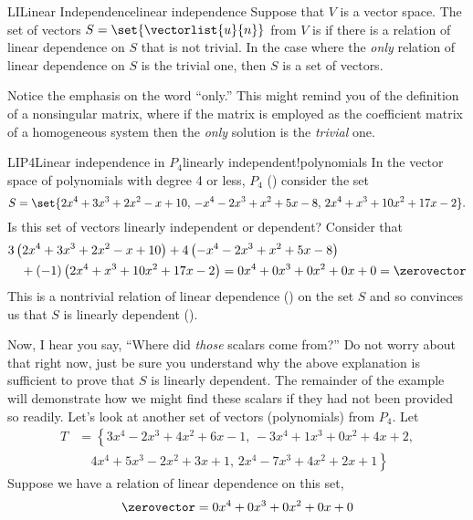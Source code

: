 %
\begin{definition}{LI}{Linear Independence}{linear independence}
Suppose that $V$ is a vector space.
The set of vectors $S=\set{\vectorlist{u}{n}}$ from $V$ is  if there is a relation of linear dependence on $S$ that is not trivial.  In the case where the {\em only} relation of linear dependence on $S$ is the trivial one, then $S$ is a  set of vectors.
\end{definition}
%
Notice the emphasis on the word ``only.''  This might remind you of the definition of a nonsingular matrix, where if the matrix is employed as the coefficient matrix of a homogeneous system then the {\em only} solution is the {\em trivial} one.
%
%
\begin{example}{LIP4}{Linear independence in $P_4$}{linearly independent!polynomials}
In the vector space of polynomials with degree 4 or less, $P_4$ () consider the set
%
\begin{equation*}
S=\set{
2x^4+3x^3+2x^2-x+10,\,
-x^4-2x^3+x^2+5x-8,\,
2x^4+x^3+10x^2+17x-2
}.
\end{equation*}
%
Is this set of vectors linearly independent or dependent?  Consider that 
%
\begin{align*}
&3\left(2x^4+3x^3+2x^2-x+10\right)
+4\left(-x^4-2x^3+x^2+5x-8\right)\\
&\quad +(-1)\left(2x^4+x^3+10x^2+17x-2\right)
=0x^4+0x^3+0x^2+0x+0=\zerovector
\end{align*}
%
This is a nontrivial relation of linear dependence () on the set $S$ and so convinces us that $S$ is linearly dependent ().\par
%
Now, I hear you say, ``Where did {\em those} scalars come from?''  Do not worry about that right now, just be sure you understand why the above explanation is sufficient to prove that $S$ is linearly dependent.  The remainder of the example will demonstrate how we might find these scalars if they had not been provided so readily.
%
Let's look at another set of vectors (polynomials) from $P_4$.  Let
%
\begin{align*}
T&=\left\{
3x^4-2x^3+4x^2+6x-1,\,
-3x^4+1x^3+0x^2+4x+2,\right.\\
&\quad \left.4x^4+5x^3-2x^2+3x+1,\,
2x^4-7x^3+4x^2+2x+1\right\}
\end{align*}
%
Suppose we have a relation of linear dependence on this set,
%
\begin{align*}
\zerovector&=0x^4+0x^3+0x^2+0x+0\\

\end{align*}
\end{example}
